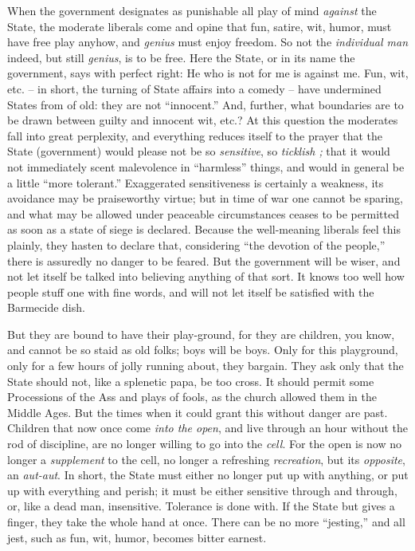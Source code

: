 When the government designates as punishable all play of mind \textit{against} 
the State, the moderate liberals come and opine that fun, satire, wit, humor, 
must have free play anyhow, and \textit{genius} must enjoy freedom. So not the 
\textit{individual man} indeed, but still \textit{genius}, is to be free. Here 
the State, or in its name the government, says with perfect right: He who is 
not for me is against me. Fun, wit, etc. -- in short, the turning of State 
affairs into a comedy -- have undermined States from of old: they are not 
``innocent.'' And, further, what boundaries are to be drawn between guilty 
and innocent wit, etc.? At this question the moderates fall into great 
perplexity, and everything reduces itself to the prayer that the State 
(government) would please not be so \textit{sensitive}, so \textit{ticklish ;} 
that it would not immediately scent malevolence in ``harmless'' things, and 
would in general be a little ``more tolerant.'' Exaggerated sensitiveness is 
certainly a weakness, its avoidance may be praiseworthy virtue; but in time of 
war one cannot be sparing, and what may be allowed under peaceable 
circumstances ceases to be permitted as soon as a state of siege is declared. 
Because the well-meaning liberals feel this plainly, they hasten to declare 
that, considering ``the devotion of the people,'' there is assuredly no 
danger to be feared. But the government will be wiser, and not let itself be 
talked into believing anything of that sort. It knows too well how people 
stuff one with fine words, and will not let itself be satisfied with the 
Barmecide dish.

But they are bound to have their play-ground, for they are children, you know, 
and cannot be so staid as old folks; boys will be boys. Only for this 
playground, only for a few hours of jolly running about, they bargain. They 
ask only that the State should not, like a splenetic papa, be too cross. It 
should permit some Processions of the Ass and plays of fools, as the church 
allowed them in the Middle Ages. But the times when it could grant this 
without danger are past. Children that now once come \textit{into the open}, 
and live through an hour without the rod of discipline, are no longer willing 
to go into the \textit{cell}. For the open is now no longer a 
\textit{supplement} to the cell, no longer a refreshing \textit{recreation}, 
but its \textit{opposite}, an \textit{aut-aut}. In short, the State must 
either no longer put up with anything, or put up with everything and perish; 
it must be either sensitive through and through, or, like a dead man, 
insensitive. Tolerance is done with. If the State but gives a finger, they 
take the whole hand at once. There can be no more ``jesting,'' and all jest, 
such as fun, wit, humor, becomes bitter earnest.

